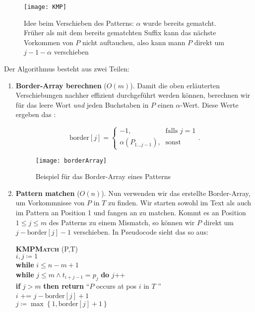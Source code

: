 \begin{figure}[H]
  \texttt{[image: KMP]}
  \caption{Idee beim Verschieben des Patterns: \( \alpha \) wurde bereits gematcht. Früher als mit dem bereits gematchten Suffix kann das nächste Vorkommen von \( P \) nicht auftauchen, also kann mann \( P \) direkt um \( j - 1 - \alpha \) verschieben}
\end{figure}

Der Algorithmus besteht aus zwei Teilen:
\begin{enumerate}
  \item \textbf{Border-Array berechnen} (\( O(m) \)). Damit die oben erläuterten Verschiebungen nachher effizient durchgeführt werden können, berechnen wir für das leere Wort \emph{und} jeden Buchstaben in \( P \) einen \( \alpha \)-Wert. Diese Werte ergeben das \label{def:borderArray}:
  \begin{minipage}{.55\textwidth}
    \begin{equation*}
      \text{border}[j] = \begin{cases}
        -1\text{,} &\text{falls } j = 1 \\
        \alpha(P_{1 \dots j-1})\text{,} &\text{sonst}
      \end{cases}\text{.}
    \end{equation*}
  \end{minipage}
  \hfill
  \begin{minipage}{.35\textwidth}
    \begin{figure}[H]
      \texttt{[image: borderArray]}
      \caption{Beispiel für das Border-Array eines Patterns}
    \end{figure}
  \end{minipage}

  \item \textbf{Pattern matchen} (\( O(n) \)). Nun verwenden wir das erstellte Border-Array, um Vorkommnisse von \( P \) in \( T \) zu finden. Wir starten sowohl im Text als auch im Pattern an Position 1 und fangen an zu matchen. Kommt es an Position \( 1 \leq j \leq m \) des Patterns zu einem Mismatch, so können wir \( P \) direkt um \( j - \text{border}[j] - 1 \) verschieben. In Pseudocode sieht das so aus:
  \begin{pseudocode}
    \textbf{\textsc{KMPMatch}} (P,T) \\
    \( i,j \coloneqq 1 \) \\
    \textbf{while} \( i \leq n - m + 1 \) \\
    \phantom{\enskip} \textbf{while} \( j \leq m \wedge t_{i+j-1} = p_j \) \textbf{do} \( j \)++ \\
    \phantom{\enskip} \textbf{if} \( j > m \) \textbf{then return} ``\( P \) occurs at pos \( i \) in \( T \) '' \\
    \phantom{\enskip} \( i \) += \( j - \text{border}[j] + 1 \) \\
    \phantom{\enskip} \( j \coloneqq \max\left \{ 1, \text{border}[j]+1 \right \} \)
  \end{pseudocode}
\end{enumerate}


